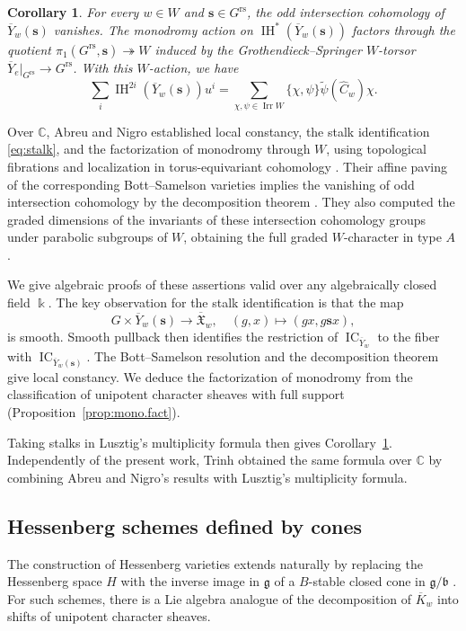 \documentclass[11pt]{amsart}
\numberwithin{equation}{section}
\newtheorem{corollary}[theorem]{Corollary}
\theoremstyle{definition}
\def\lra{\longrightarrow }
\def\beq{\begin{equation}}
\def\eeq{\end{equation}}
\DeclareMathOperator{\Irr}{\mathrm{Irr}}
\DeclareMathOperator{\IC}{\mathrm{IC}}
\def\C{\mathbb{C}}
\def\fg{\mathfrak {g}}
\def\fb{\mathfrak {b}}
\def\fX{\mathfrak {X}}
\def\Grs{G^{\mathrm{rs}}}
\DeclareMathOperator{\IH}{\mathrm{IH}}
\begin{document}
\begin{corollary}\label{cor:lus.formula}
For every $w\in W$ and $\mathbf s\in\Grs$, the odd intersection cohomology of $\overline Y_w(\mathbf s)$ vanishes.
The monodromy action on $\IH^*(\overline Y_w(\mathbf s))$ factors through the quotient
$\pi_1(\Grs,\mathbf s)\twoheadrightarrow W$
induced by the Grothendieck--Springer $W$-torsor $\overline Y_e|_{\Grs}\to\Grs$.
With this $W$-action, we have
\[
\sum_i \IH^{2i}(\overline Y_w(\mathbf s))u^i =\sum_{\chi,\psi\in\Irr W}
	\{\chi,\psi\}\widetilde\psi(\widehat C_w)\chi.
\]
\end{corollary}

Over $\C$, Abreu and Nigro established local constancy, the stalk identification \eqref{eq:stalk}, and the factorization of monodromy through $W$, using topological fibrations and localization in torus-equivariant cohomology \cite{AN}.
Their affine paving of the corresponding Bott--Samelson varieties implies the vanishing of odd intersection cohomology by the decomposition theorem \cite[Theorem~1.6(1)]{AN}.
They also computed the graded dimensions of the invariants of these intersection cohomology groups under parabolic subgroups of $W$, obtaining the full graded $W$-character in type $A$ \cite[Theorem~1.5]{AN}.


We give algebraic proofs of these assertions valid over any algebraically closed field $\Bbbk$.
The key observation for the stalk identification is that the map
\beq\label{eq:smooth.map.Lusztig}
G\times\overline Y_w(\mathbf s)\lra
\overline{\fX}_w,\quad (g,x)\mapsto(gx,g\mathbf s x),
\eeq
is smooth.
Smooth pullback then identifies the restriction of $\IC_{\overline Y_w}$ to the fiber with $\IC_{\overline Y_w(\mathbf s)}$.
The Bott--Samelson resolution and the decomposition theorem give local constancy.
We deduce the factorization of monodromy from the classification of unipotent character sheaves with full support (Proposition~\ref{prop:mono.fact}).

Taking stalks in Lusztig's multiplicity formula then gives Corollary~\ref{cor:lus.formula}.
Independently of the present work, Trinh \cite{trinh2026haimansconjecturespringersrepresentations}
obtained the same formula over $\C$ by combining Abreu and Nigro's results with Lusztig's multiplicity formula.




\subsection{Hessenberg schemes defined by cones}
\label{ss:nonlinear.intro}
The construction of Hessenberg varieties extends naturally by replacing the Hessenberg space $H$ with the inverse image in $\fg$ of a $B$-stable closed cone in $\fg/\fb$ \cite[Section~5.1]{BHL25}.
For such schemes, there is a Lie algebra analogue of the decomposition of $\overline K_w$ into shifts of unipotent character sheaves.
\end{document}
